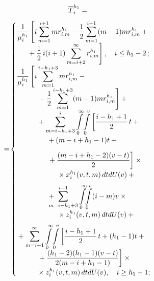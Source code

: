 \begin{multicols}{2}
\noindent
\begin{multline}
\overline{T}_i^{h_1}={}\\[4pt]
\!\!{}=\!\begin{cases}
\displaystyle \fr{1}{\mu_i^{h_1}}\left[ i \sum\limits_{m=1}^{i+1} 
mr_{i,m}^{h_1}-\fr{1}{2}\sum\limits_{m=1}^{i+1} (m-1)mr^{h_1}_{i,m} +{}\right.\\[6pt]
\hspace*{5mm}\left.{}+\fr{1}{2}\,i(i+1) \displaystyle\sum\limits^\infty_{m=i+2} r^{h_1}_{i,m}\right], \ \ \ i\leq h_1-2\,;\\[6pt]
\displaystyle\fr{1}{\mu_i^{h_1}} \left[ i \sum\limits_{m=1}^{i-h_1+3} mr^{h_1}_{i,m} -{}\right.\\[6pt]
\hspace*{10mm}\left. {}-
\fr{1}{2}\sum\limits_{m=1}^{i-h_1+3}(m-1)mr^{h_1}_{i,m}\right]+{}\\[6pt]
\hspace*{10mm}\displaystyle{}+
   \sum\limits^i_{m=i-h_1+3} \int\limits_0^\infty\!\int\limits_0^v \left[ \fr{i-h_1+1}{2}\,t +{}\right.\\[6pt]
  \hspace*{15mm} {}+(m-i+h_1-1)t+{}\\[9pt]
\hspace*{15mm}\left.   {}+  \fr{(m-i+h_1-2)(v-t)}{2}\right]\times{}\\[6pt]
\hspace*{20mm}{}\times  x_i^{h_1}(v,t,m)\,dtdU(v)+{}\\[6pt]
   \hspace*{15mm}{}+
   \displaystyle\!\!\!\!\!\! \sum\limits^{i-1}_{m=i-h_1+3} \int\limits_0^\infty\!\!\int\limits_0^v (i-m)v\times{}\\[6pt]
   \hspace*{20mm}{}\times z_i^{h_1}(v,t,m)\,dtdU(v)+{}\\[6pt]
{}+
   \displaystyle\sum\limits^\infty_{m=i+1} \int\limits_0^\infty\!\int\limits_0^v \left[ 
   \fr{i-h_1+1}{2}\,t +(h_1-1)t +{}\right.\\[6pt]
\hspace*{10mm}\left.   {}+\fr{(h_1-2)(h_1-1)(v-t)} {2(m-i+h_1-1)}\right]\times{}\\[6pt]
\hspace*{10mm}{}\times z_i^{h_1}(v,t,m)\,dtdU(v),  \ \ \ i\geq h_1-1;
\end{cases}\!\!\!\!
\label{e6-aga}
   \end{multline}


\end{multicols}
